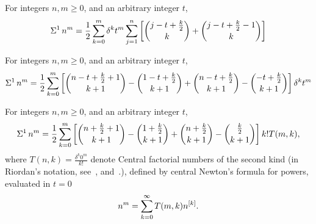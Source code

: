\begin{proposition}
  For integers $n,m \geq 0$, and an arbitrary integer $t$,
  \begin{align*}
    \Sigma^{1}\,{n}^{m} = \frac{1}{2} \sum_{k=0}^{m} \delta^{k} t^m
    \sum_{j=1}^{n}
    \left[
      \binom{j-t+\frac{k}{2}}{k} + \binom{j-t+\frac{k}{2}-1}{k}
    \right]
  \end{align*}
\end{proposition}

\begin{proposition}
  \label{prop:ordinary-sums-of-powers-decomposition}
  For integers $n,m \geq 0$, and an arbitrary integer $t$,
  \begin{align*}
    \Sigma^{1}\,{n}^{m} = \frac{1}{2} \sum_{k=0}^{m}
    \left[
      \binom{n -t + \frac{k}{2} +1}{k+1} - \binom{1 -t + \tfrac{k}{2}}{k+1}
      + \binom{n -t + \frac{k}{2}}{k+1} - \binom{-t + \tfrac{k}{2}}{k+1}
    \right] \delta^{k} t^m
  \end{align*}
\end{proposition}

\begin{proposition}
  \label{prop:central-factorial-numbers-sums}
  For integers $n,m \geq 0$, and an arbitrary integer $t$,
  \begin{align*}
    \Sigma^{1}\,{n}^{m} = \frac{1}{2} \sum_{k=0}^{m}
    \left[
      \binom{n + \frac{k}{2} +1}{k+1} - \binom{1 + \tfrac{k}{2}}{k+1}
      + \binom{n + \frac{k}{2}}{k+1} - \binom{\tfrac{k}{2}}{k+1}
    \right] k! T(m,k),
  \end{align*}
  where $T(n,k)=\frac{\delta^{k} 0^m}{k!}$ denote Central factorial numbers of the second kind
  (in Riordan's notation, see~\cite[p. 213]{riordan1968combinatorial},
  and~\cite{carlitz1963divided}.),
  defined by central Newton's formula for powers,
  evaluated in
  $t=0$
  \begin{align*}
    n^m = \sum_{k=0}^{\infty} T(m,k) n^{[k]}.
  \end{align*}
\end{proposition}




